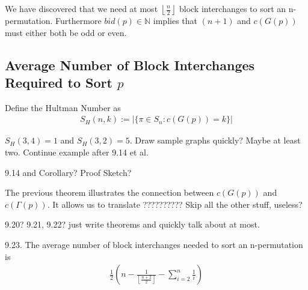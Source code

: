 \begin{remark}
We have discovered that we need at most $\left \lfloor{\frac{n}{2}}\right \rfloor $ block interchanges to sort an n-permutation. Furthermore $bid(p) \in \mathbb{N}$ implies that $(n+1)$ and $c(G(p))$ must either both be odd or even.
\end{remark}


\subsection{Average Number of Block Interchanges Required to Sort $p$}

\begin{definition}
Define the Hultman Number as
\begin{align*}
S_H(n,k) := | \{ \pi \in S_n : c(G(p)) = k \} |
\end{align*}
\end{definition}

\begin{example}
$S_H(3,4) = 1$ and $S_H(3,2)=5$.
Draw sample graphs quickly? Maybe at least two.
Continue example after 9.14 et al.
\end{example}


\begin{theorem}
9.14 and Corollary? Proof Sketch?
\end{theorem}

\begin{remark}
The previous theorem illustrates the connection between $c(G(p))$ and $c(\Gamma (p))$. It allows us to translate ?????????? Skip all the other stuff, useless?
\end{remark}

\begin{theorem}
9.20? 9.21, 9.22? just write theorems and quickly talk about at most.
\end{theorem}

\begin{theorem}
9.23. The average number of block interchanges needed to sort an n-permutation is
\begin{align*}
\frac{1}{2} (n- \frac{1}{ \left \lfloor{\frac{n+2}{2}}\right \rfloor} - \sum^n_{i=2} \frac{1}{i} )
\end{align*}
\end{theorem}

\begin{appendix}


\end{appendix}


